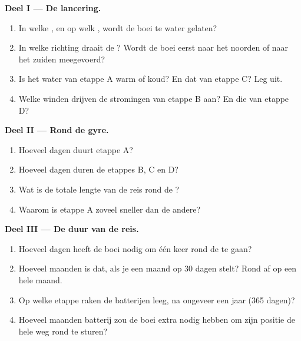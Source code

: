 \begin{problem}
\noindent\textbf{Deel I --- De lancering.}\par\nopagebreak
\begin{enumerate}[beginpenalty=10000]
  \item In welke , en op welk , wordt de boei te water
        gelaten?
  \item In welke richting draait de ? Wordt de boei eerst naar het
        noorden of naar het zuiden meegevoerd?
  \item Is het water van etappe A warm of koud? En dat van etappe C? Leg
        uit.
  \item Welke winden drijven de stromingen van etappe B aan? En die van
        etappe D?
\end{enumerate}

\noindent\textbf{Deel II --- Rond de gyre.}\par\nopagebreak
\begin{enumerate}[resume, beginpenalty=10000]
  \item Hoeveel dagen duurt etappe A?
  \item Hoeveel dagen duren de etappes B, C en D?
  \item Wat is de totale lengte van de reis rond de ?
  \item Waarom is etappe A zoveel sneller dan de andere?
\end{enumerate}

\noindent\textbf{Deel III --- De duur van de reis.}\par\nopagebreak
\begin{enumerate}[resume, beginpenalty=10000]
  \item Hoeveel dagen heeft de boei nodig om één keer rond de  te gaan?
  \item Hoeveel maanden is dat, als je een maand op 30 dagen stelt? Rond af
        op een hele maand.
  \item Op welke etappe raken de batterijen leeg, na ongeveer een jaar
        (365 dagen)?
  \item Hoeveel maanden batterij zou de boei extra nodig hebben om zijn
        positie de hele weg rond te sturen?
\end{enumerate}
\end{problem}
